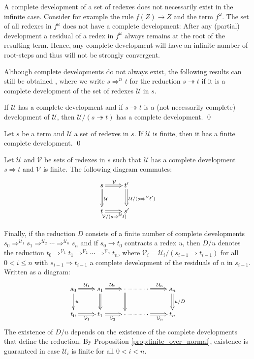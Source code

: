 \documentclass{LMCS}
\theoremstyle{definition}
\newcommand{\rew}{\rightarrow}
\newcommand{\trewt}{\twoheadrightarrow}
\newcommand{\dev}{\Rightarrow}
\newcommand{\fscd}[3]{{#1}_0 \dev^{\mathcal{#2}_1} {#1}_1 \dev^{\mathcal{#2}_2} \cdots \dev^{\mathcal{#2}_{#3}} {#1}_{#3}}
\begin{document}
A complete development of a set of redexes does not necessarily exist in the infinite case. Consider for example the rule $f(Z) \rew Z$ and the term $f^\omega$. The set of all redexes in $f^\omega$ does not have a complete development: After any (partial) development a residual of a redex in $f^\omega$ always remains at the root of the resulting term. Hence, any complete development will have an infinite number of root-steps and thus will not be strongly convergent.

Although complete developments do not always exist, the following results can still be obtained \cite{JJ05b}, where we write $s \dev^\mathcal{U} t$ for the reduction $s \trewt t$ if it is a complete development of the set of redexes $\mathcal{U}$ in $s$.

\begin{lem}
\label{cdacrossd}
If $\mathcal{U}$ has a complete development and if $s \trewt t$ is a (not necessarily complete) development of $\mathcal{U}$, then $\mathcal{U}/(s \trewt t)$ has a complete development. \qed
\end{lem}

\begin{lem}
\label{lem:finite_dev}
Let $s$ be a term and $\mathcal{U}$ a set of redexes in $s$. If $\mathcal{U}$ is finite, then it has a finite complete development. \qed
\end{lem}

\begin{prop}
\label{prop:finite_over_normal}
Let $\mathcal{U}$ and $\mathcal{V}$ be sets of redexes in $s$
such that $\mathcal{U}$ has a complete development $s \dev t$ and 
$\mathcal{V}$ is finite. The following diagram commutes:
\[
\xymatrix{
s \ar@{=>}[r]^{\mathcal{V}} \ar@{=>}[d]^{\mathcal{U}} & t'
\ar@{=>}[d]^{\mathcal{U}/(s \dev^\mathcal{V} t')} \\
t \ar@{=>}[r]_{\mathcal{V}/(s \dev^\mathcal{U} t)} & s'
}
\]
\end{prop}

Finally, if the reduction $D$ consists of a finite number of complete developments $\fscd{s}{U}{n}$ and if $s_0 \rew t_0$ contracts a redex $u$, then $D / u$ denotes the reduction $\fscd{t}{V}{n}$, where $\mathcal{V}_i = \mathcal{U}_i / (s_{i - 1} \dev t_{i - 1})$ for all $0 < i \leq n$ with $s_{i - 1} \dev t_{i - 1}$ a complete development of the residuals of $u$ in $s_{i - 1}$. Written as a diagram:
\[
\xymatrix{
s_0 \ar@{=>}[r]^{\mathcal{U}_1} \ar[d]^{u}
  & s_1 \ar@{=>}[r]^{\mathcal{U}_2} \ar@{=>}[d]
  & \cdot \ar@{.}[r] \ar@{=>}[d]
  & \cdot \ar@{=>}[r]^{\mathcal{U}_n}
  & s_n \ar@{=>}[d]^{u/D} \\
t_0 \ar@{=>}[r]_{\mathcal{V}_1}
  & t_1 \ar@{=>}[r]_{\mathcal{V}_2}
  & \cdot \ar@{.}[r]
  & \cdot \ar@{=>}[r]_{\mathcal{V}_n}
  & t_n
}
\]
The existence of $D / u$ depends on the existence of the complete developments that define the reduction. By Proposition \ref{prop:finite_over_normal}, existence is guaranteed in case $\mathcal{U}_i$ is finite for all $0 < i < n$.
\end{document}

